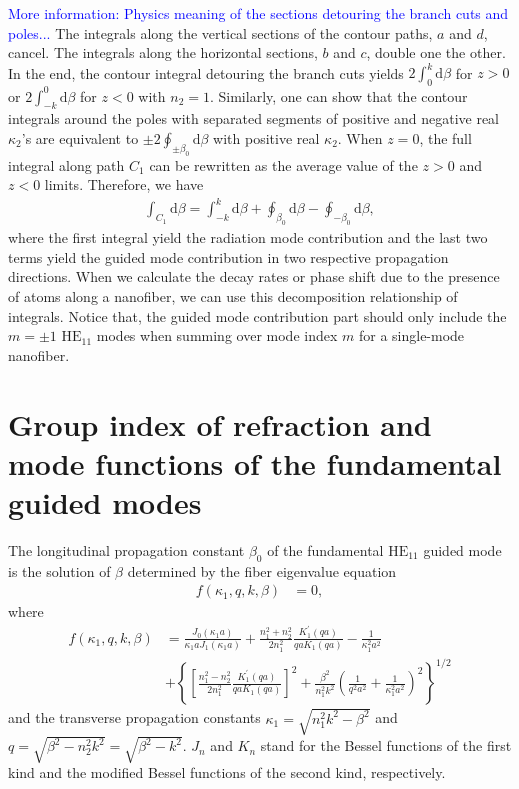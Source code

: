 \documentclass[preprint,aps,pra,onecolumn]{revtex4-1} %
\begin{document}
\textcolor{blue}{More information: Physics meaning of the sections detouring the branch cuts and poles...} The integrals along the vertical sections of the contour paths, $ a $ and $ d $, cancel. The integrals along the horizontal sections, $ b $ and $ c $, double one the other. In the end, the contour integral detouring the branch cuts yields $ 2\int_0^k\mathrm{d}\beta $ for $ z>0 $ or $ 2\int_{-k}^0\mathrm{d}\beta $ for $ z<0 $ with $ n_2=1 $. Similarly, one can show that the contour integrals around the poles with separated segments of positive and negative real $ \kappa_2 $'s are equivalent to $ \pm 2\oint_{\pm \beta_0}\!\!\mathrm{d}\beta $ with positive real $ \kappa_2 $. When $ z=0 $, the full integral along path $ C_1 $ can be rewritten as the average value of the $ z>0 $ and $ z<0 $ limits. Therefore, we have 
\begin{align}
\int_{C_1}\mathrm{d}\beta =\int_{-k}^k\mathrm{d}\beta +\oint_{\beta_0}\mathrm{d}\beta -\oint_{-\beta_0}\!\!\mathrm{d}\beta,
\end{align}
where the first integral yield the radiation mode contribution and the last two terms yield the guided mode contribution in two respective propagation directions. When we calculate the decay rates or phase shift due to the presence of atoms along a nanofiber, we can use this decomposition relationship of integrals. Notice that, the guided mode contribution part should only include the $ m=\pm 1 $ $\mathrm{HE}_{11}$ modes when summing over mode index $ m $ for a single-mode nanofiber. 



\section{Group index of refraction and mode functions of the fundamental guided modes}\label{ch:guidedmodes}
The longitudinal propagation constant $\beta_0$ of the fundamental $\mathrm{HE}_{11}$ guided mode is the solution of $\beta$ determined by the fiber eigenvalue equation~\cite{LeKien2005}
\begin{align}
f(\kappa_1,q,k,\beta) &=0,
\end{align}
where
\begin{align}
f(\kappa_1,q,k,\beta) &=\frac{J_0(\kappa_1a)}{\kappa_1aJ_1(\kappa_1a)}+\frac{n_1^2+n_2^2}{2n_1^2}\frac{K_1^\prime(qa)}{qaK_1(qa)}-\frac{1}{\kappa_1^2a^2} \\
&+\left\{\left[\frac{n_1^2-n_2^2}{2n_1^2}\frac{K_1^\prime(qa)}{qaK_1(qa)} \right]^2 +\frac{\beta^2}{n_1^2k^2}\left(\frac{1}{q^2a^2}+\frac{1}{\kappa_1^2a^2} \right)^2 \right\}^{1/2}
\end{align}
and the transverse propagation constants $\kappa_1=\sqrt{n_1^2k^2-\beta^2}$ and $q=\sqrt{\beta^2-n_2^2k^2}=\sqrt{\beta^2-k^2}$. $J_n$ and $K_n$ stand for the Bessel functions of the first kind and the modified Bessel functions of the second kind, respectively. 
\end{document}
